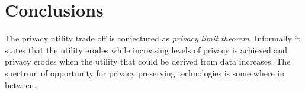 \documentclass[11pt, oneside]{article}   	%
\numberwithin{equation}{section}
\begin{document}
\section{Conclusions}
The privacy utility trade off is conjectured as \emph{privacy limit theorem}. Informally it states that the utility erodes while increasing levels of privacy is achieved and privacy erodes when the utility that could be derived from data increases. The spectrum of opportunity for privacy preserving technologies is some where in between. 
 
\end{document}
